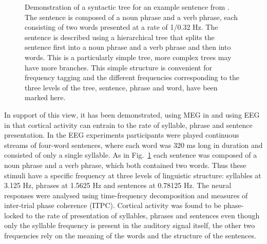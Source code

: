 \documentclass[10pt,letterpaper]{article}
\begin{document}
\begin{figure}[tb]
\begin{center}
\end{center}
\caption{Demonstration of a syntactic tree for an example sentence
  from \cite{DingEtAl2016, DingEtAl2017}. The sentence is composed of
  a noun phrase and a verb phrase, each consisting of two words
  presented at a rate of 1/0.32 Hz.  The sentence is described using a
  hierarchical tree that splits the sentence first into a noun phrase
  and a verb phrase and then into words. This is a particularly simple
  tree, more complex trees may have more branches. This simple
  structure is convenient for frequency tagging and the different
  frequencies corresponding to the three levels of the tree, sentence,
  phrase and word, have been marked here.}
\label{fig:freq_tree}
\end{figure}

In support of this view, it has been demonstrated, using MEG in
\cite{DingEtAl2016} and using EEG in \cite{DingEtAl2017} that cortical
activity can entrain to the rate of syllable, phrase and sentence
presentation. In the EEG experiments participants were played
continuous streams of four-word sentences, where each word was 320 ms
long in duration and consisted of only a single syllable. As in
Fig.~\ref{fig:freq_tree} each sentence was composed of a noun phrase
and a verb phrase, which both contained two words. Thus these stimuli
have a specific frequency at three levels of linguistic structure:
syllables at 3.125 Hz, phrases at 1.5625 Hz and sentences at 0.78125
Hz. The neural responses were analysed using time-frequency
decomposition and measures of inter-trial phase coherence
(ITPC). Cortical activity was found to be phase-locked to the rate of
presentation of syllables, phrases and sentences even though only the
syllable frequency is present in the auditory signal itself, the other
two frequencies rely on the meaning of the words and the structure of
the sentences.
\end{document}
